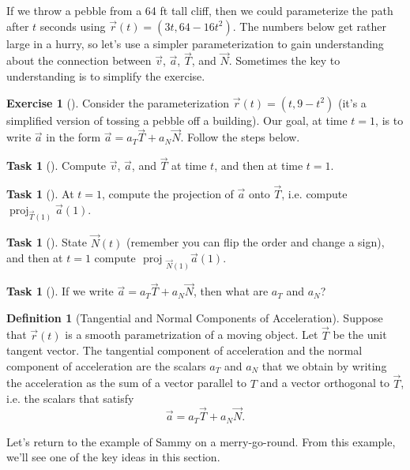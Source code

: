 \documentclass[10pt,]{book}
\theoremstyle{plain}
\theoremstyle{definition}
\newtheorem{definition}[theorem]{Definition}
\theoremstyle{definition}
\theoremstyle{definition}
\theoremstyle{definition}
\newtheorem{exploration}[project]{Exercise}
\newtheorem{task}[project]{Task}
\theoremstyle{definition}
\numberwithin{equation}{section}
\DeclareMathOperator{\proj}{proj}
\begin{document}
If we throw a pebble from a 64 ft tall cliff, then we could parameterize the path after \(t\) seconds using \(\vec r(t) = (3t,64-16t^2)\). The numbers below get rather large in a hurry, so let's use a simpler parameterization to gain understanding about the connection between \(\vec v\), \(\vec a\), \(\vec T\), and \(\vec N\). Sometimes the key to understanding is to simplify the exercise.%
\begin{exploration}[]\label{exploration-181}
Consider the parameterization \(\vec r(t) = (t,9-t^2)\) (it's a simplified version of tossing a pebble off a building). Our goal, at time \(t=1\), is to write \(\vec a\) in the form \(\vec a = a_T\vec T+a_N\vec N.\) Follow the steps below.%
\begin{task}[]\label{task-446}
Compute \(\vec v\), \(\vec a\), and \(\vec T\) at time \(t\), and then at time \(t=1\).%
\end{task}
\begin{task}[]\label{task-447}
At \(t=1\), compute the projection of \(\vec a\) onto \(\vec T\), i.e. compute \(\proj_{\vec T(1)}\vec a(1)\).%
\end{task}
\begin{task}[]\label{task-448}
State \(\vec N(t)\) (remember you can flip the order and change a sign), and then at \(t=1\) compute \(\text{ proj } _{\vec N(1)}\vec a(1)\).%
\end{task}
\begin{task}[]\label{task-449}
If we write \(\vec a = a_T\vec T +a_N\vec N\), then what are \(a_T\) and \(a_N\)?%
\end{task}
\end{exploration}
\begin{definition}[{Tangential and Normal Components of Acceleration}]\label{definition-30}
Suppose that \(\vec r(t)\) is a smooth parametrization of a moving object. Let \(\vec T\) be the unit tangent vector. The tangential component of acceleration and the normal component of acceleration are the scalars \(a_T\) and \(a_N\) that we obtain by writing the acceleration as the sum of a vector parallel to \(T\) and a vector orthogonal to \(\vec T\), i.e. the scalars that satisfy%
\begin{equation*}
\vec a = a_T\vec T+a_N\vec N.
\end{equation*}
%
\end{definition}
Let's return to the example of Sammy on a merry-go-round. From this example, we'll see one of the key ideas in this section.%
\end{document}
